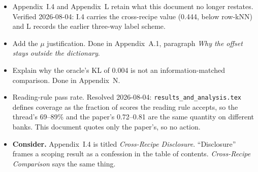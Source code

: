 \documentclass[11pt]{article}
\begin{document}
{\begin{itemize}[label=$\square$]
models at two budgets. Note $k=32$ carries 1 seed and rowEV is withheld where
the dead rate exceeds the selection threshold.
\item[$\boxtimes$] Appendix~I.4 and Appendix~L retain what this document no
longer restates. Verified 2026-08-04: I.4 carries the cross-recipe value
(0.444, below row-kNN) and L records the earlier three-way label scheme.
\item[$\boxtimes$] Add the $\mu$ justification. Done in Appendix~A.1,
paragraph \emph{Why the offset stays outside the dictionary}.
\item[$\boxtimes$] Explain why the oracle's KL of 0.004 is not an
information-matched comparison. Done in Appendix~N.
\item[$\boxtimes$] Reading-rule pass rate. Resolved 2026-08-04:
\texttt{results\_and\_analysis.tex} defines coverage as the fraction of
scores the reading rule accepts, so the thread's 69--89\% and the paper's
0.72--0.81 are the same quantity on different banks. This document quotes
only the paper's, so no action.
\item \textbf{Consider.} Appendix~I.4 is titled \emph{Cross-Recipe
Disclosure}. ``Disclosure'' frames a scoping result as a confession in the
table of contents. \emph{Cross-Recipe Comparison} says the same thing.
\end{itemize}

}
\end{document}
